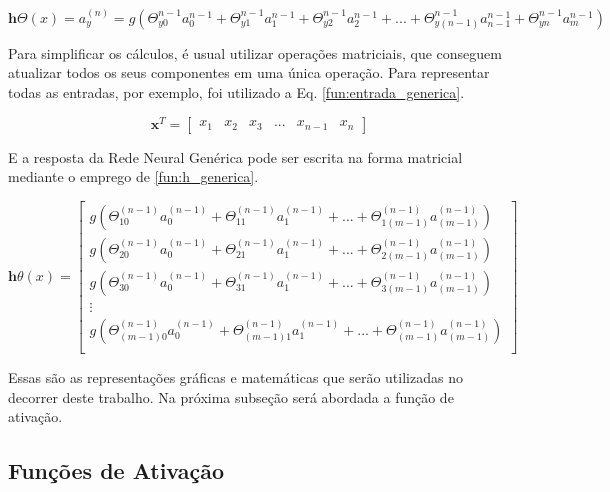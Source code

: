 \begin{equation}
    \mathbf{h}{\Theta}(x) = a^{(n)}_y = g(\Theta^{n-1}_{y0}a^{n-1}_{0}+\Theta^{n-1}_{y1}a^{n-1}_{1}+\Theta^{n-1}_{y2}a^{n-1}_{2}+...+\Theta^{n-1}_{y(n-1)}a^{n-1}_{n-1}+\Theta^{n-1}_{yn}a^{n-1}_{m})
     \label{fun:thetanm}
\end{equation}


Para simplificar os cálculos, é usual utilizar operações matriciais, que conseguem atualizar todos os seus componentes em uma única operação. Para representar todas as entradas, por exemplo, foi utilizado a Eq. \ref{fun:entrada_generica}.


\begin{equation}
    \label{fun:entrada_generica}
  \mathbf{x}^T = \begin{bmatrix}x_{1}&x_{2}&x_{3}&...&x_{n-1}&x_{n}\end{bmatrix}
\end{equation}

E a resposta da Rede Neural Genérica pode ser escrita na forma matricial mediante o emprego de \eqref{fun:h_generica}.

 \begin{equation}
   \label{fun:h_generica}
   \mathbf{h}\theta(x) = 
   \begin{bmatrix}
   g(\Theta^{(n-1)}_{10}a^{(n-1)}_{0}+\Theta^{(n-1)}_{11}a^{(n-1)}_{1}+ ... +\Theta^{(n-1)}_{1(m-1)}a^{(n-1)}_{(m-1)} )\\
   g(\Theta^{(n-1)}_{20}a^{(n-1)}_{0}+\Theta^{(n-1)}_{21}a^{(n-1)}_{1}+ ... +\Theta^{(n-1)}_{2(m-1)}a^{(n-1)}_{(m-1)} )\\
   g(\Theta^{(n-1)}_{30}a^{(n-1)}_{0}+\Theta^{(n-1)}_{31}a^{(n-1)}_{1}+ ... +\Theta^{(n-1)}_{3(m-1)}a^{(n-1)}_{(m-1)} )\\
    \vdots\\
    g(\Theta^{(n-1)}_{(m-1)0}a^{(n-1)}_{0}+\Theta^{(n-1)}_{(m-1)1}a^{(n-1)}_{1}+ ... +\Theta^{(n-1)}_{(m-1)}a^{(n-1)}_{(m-1)} )\\
    
   \end{bmatrix} 
\end{equation}


Essas são as representações gráficas e matemáticas que serão utilizadas no decorrer deste trabalho. Na próxima subseção será abordada a função de ativação.

\subsection{Funções de Ativação}
\label{sec:funcaoativacao}

